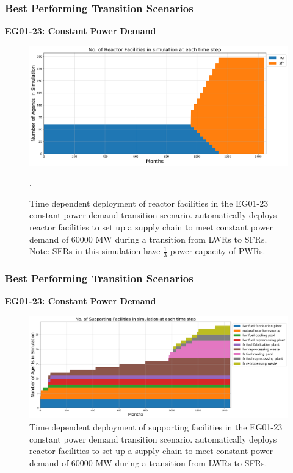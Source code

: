 \begin{frame}
    \frametitle{Best Performing Transition Scenarios}
    \textbf{EG01-23: Constant Power Demand}
    \begin{figure}[htbp!]
        \begin{center}
          \includegraphics[width=\textwidth]{../paper/figures/eg23-stack_reactor.png}
        \end{center}
              \caption{Time dependent deployment of reactor facilities in 
              the EG01-23 constant power demand transition scenario. 
              \deploy automatically deploys reactor facilities 
              to set up a supply chain to meet constant power demand of $60000$ MW
              during a transition from \glspl{LWR} to \glspl{SFR}. Note: \glspl{SFR}
              in this simulation have $\frac{1}{3}$ power capacity of \glspl{PWR}.}.
      \end{figure}
\end{frame}

\begin{frame}
    \frametitle{Best Performing Transition Scenarios}
    \textbf{EG01-23: Constant Power Demand}
    \begin{figure}[htbp!]
        \begin{center}
          \includegraphics[width=\textwidth]{../paper/figures/eg23-stack_support.png}
        \end{center}
              \caption{Time dependent deployment of supporting facilities in 
              the EG01-23 constant power demand transition scenario. 
              \deploy automatically deploys reactor facilities 
              to set up a supply chain to meet constant power demand of $60000$ MW
              during a transition from \glspl{LWR} to \glspl{SFR}.}
      \end{figure}
\end{frame}

